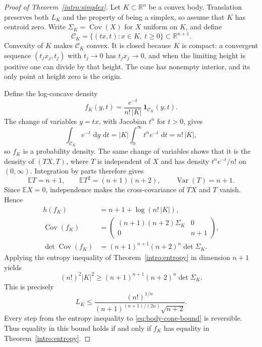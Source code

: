 \documentclass[11pt]{article}
\theoremstyle{definition}
\theoremstyle{remark}
\numberwithin{equation}{section}
\begin{document}
\begin{proof}[Proof of Theorem~\ref{intro:simplex}]
Let $K\subset\mathbb R^n$ be a convex body.  Translation preserves both $L_K$
and the property of being a simplex, so assume that $K$ has centroid
zero.  Write $\Sigma_K=\operatorname{Cov}(X)$ for $X$ uniform on $K$, and define
\begin{equation}\label{eq:body-cone}
  \mathcal C_K=\{(tx,t):x\in K,\ t\geq0\}\subset\mathbb R^{n+1}.
\end{equation}
Convexity of $K$ makes $\mathcal C_K$ convex.  It is closed because $K$
is compact: a convergent sequence $(t_jx_j,t_j)$ with $t_j\to0$ has
$t_jx_j\to0$, and when the limiting height is positive one can divide
by that height.  The cone has nonempty interior, and its only point
at height zero is the origin.

Define the log-concave density
\begin{equation}\label{eq:body-cone-density}
  f_K(y,t)=\frac{e^{-t}}{n!\,|K|}\,
  \mathbf 1_{\mathcal C_K}(y,t).
\end{equation}
The change of variables $y=tx$, with Jacobian $t^n$ for $t>0$, gives
\[
  \int_{\mathcal C_K}e^{-t}\,\,\mathrm d y\,\,\mathrm d t
  =|K|\int_0^\infty t^ne^{-t}\,\,\mathrm d t=n!\,|K|,
\]
so $f_K$ is a probability density.  The same change of variables shows
that it is the density of $(TX,T)$, where $T$ is independent of $X$
and has density $t^ne^{-t}/n!$ on $(0,\infty)$.  Integration by parts
therefore gives
\[
  \mathbb E T=n+1,\qquad
  \mathbb E T^2=(n+1)(n+2),\qquad
  \operatorname{Var}(T)=n+1.
\]
Since $\mathbb E X=0$, independence makes the cross-covariance of $TX$ and
$T$ vanish.  Hence
\begin{align}
  h(f_K)&=n+1+\log(n!\,|K|),\label{eq:body-cone-entropy}\\
  \operatorname{Cov}(f_K)&=
  \begin{pmatrix}
    (n+1)(n+2)\Sigma_K&0\\
    0&n+1
  \end{pmatrix},\label{eq:body-cone-covariance}\\
  \det\operatorname{Cov}(f_K)&=(n+1)^{n+1}(n+2)^n\det\Sigma_K.
  \label{eq:body-cone-determinant}
\end{align}
Applying the entropy inequality of Theorem~\ref{intro:entropy} in
dimension $n+1$ yields
\begin{equation}\label{eq:body-cone-bound}
  (n!)^2|K|^2\geq
  (n+1)^{n+1}(n+2)^n\det\Sigma_K.
\end{equation}
This is precisely
\[
  L_K\leq
  \frac{(n!)^{1/n}}{(n+1)^{(n+1)/(2n)}\sqrt{n+2}}.
\]
Every step from the entropy inequality to \eqref{eq:body-cone-bound}
is reversible.  Thus equality in this bound holds if and only if
$f_K$ has equality in Theorem~\ref{intro:entropy}.


\end{proof}
\end{document}
